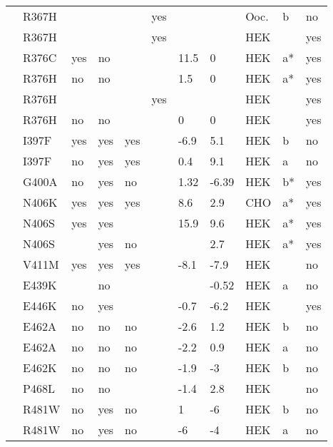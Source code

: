 \begin{tiny}
\begin{longtable}{p{4cm}|l|llll|ll|lll}
\citet{Vatta2002bMutationDB} & R367H &  &  &  & yes &  &  & Ooc. & b & no \\
\citet{Watanabe2011aMutationDB} & R367H &  &  &  & yes &  &  & HEK &  & yes \\
\citet{Detta2014MutationDB} & R376C & yes & no &  &  & 11.5 & 0 & HEK & a* & yes \\
\citet{Detta2014MutationDB} & R376H & no & no &  &  & 1.5 & 0 & HEK & a* & yes \\
\citet{Frustaci2005MutationDB} & R376H &  &  &  & yes &  &  & HEK &  & yes \\
\citet{Rossenbacker2004MutationDB} & R376H & no & no &  &  & 0 & 0 & HEK &  & yes \\
\citet{Kapplinger2015MutationDB} & I397F & yes & yes & yes &  & -6.9 & 5.1 & HEK & b & no \\
\citet{Kapplinger2015MutationDB} & I397F & no & yes & yes &  & 0.4 & 9.1 & HEK & a & no \\
\citet{Hu2007MutationDB} & G400A & no & yes & no &  & 1.32 & -6.39 & HEK & b* & yes \\
\citet{Kato2014MutationDB} & N406K & yes & yes & yes &  & 8.6 & 2.9 & CHO & a* & yes \\
\citet{Itoh2005bMutationDB} & N406S & yes & yes &  &  & 15.9 & 9.6 & HEK & a* & yes \\
\citet{Itoh2007MutationDB} & N406S &  & yes & no &  &  & 2.7 & HEK & a* & yes \\
\citet{Horne2011MutationDB} & V411M & yes & yes & yes &  & -8.1 & -7.9 & HEK &  & no \\
\citet{Hoshi2014MutationDB} & E439K &  & no &  &  &  & -0.52 & HEK & a & no \\
\citet{Crotti2012aMutationDB} & E446K & no & yes &  &  & -0.7 & -6.2 & HEK &  & yes \\
\citet{Kapplinger2015MutationDB} & E462A & no & no & no &  & -2.6 & 1.2 & HEK & b & no \\
\citet{Kapplinger2015MutationDB} & E462A & no & no & no &  & -2.2 & 0.9 & HEK & a & no \\
\citet{Kapplinger2015MutationDB} & E462K & no & no & no &  & -1.9 & -3 & HEK & b & no \\
\citet{Holst2009MutationDB} & P468L & no & no &  &  & -1.4 & 2.8 & HEK &  & no \\
\citet{Tan2005MutationDB} & R481W & no & yes & no &  & 1 & -6 & HEK & b & no \\
\citet{Tan2005MutationDB} & R481W & no & yes & no &  & -6 & -4 & HEK & a & no \\

\end{longtable}
\end{tiny}
